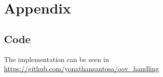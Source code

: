 \documentclass[a4paper,12pt]{report}
\begin{document}
\newpage
{}













\clearpage
{}
{}





\chapter*{Appendix}
\section*{Code}
\label{app:code}
The implementation can be seen in \url{https://github.com/yonathansantosa/oov_handling}


\end{document}
